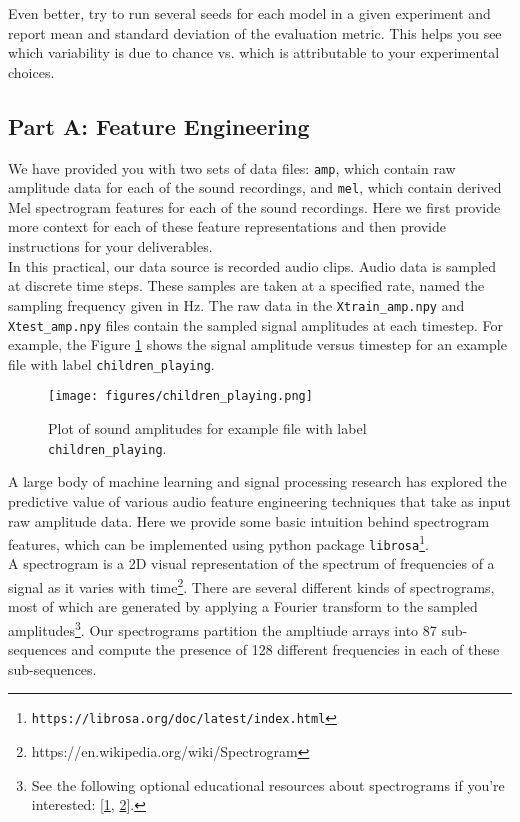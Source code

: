 \documentclass[12pt]{article}
\begin{document}
\noindent Even better, try to run several seeds for each model in a given experiment and report mean and standard deviation of the evaluation metric. This helps you see which variability is due to chance vs. which is attributable 
to your experimental choices.

\subsection{Part A: Feature Engineering}

We have provided you with two sets of data files: \texttt{amp}, which contain raw amplitude data for each of the sound recordings, and \texttt{mel}, which contain derived Mel spectrogram features for each of the sound recordings.  Here we first provide more context for each of these feature representations and then provide instructions for your deliverables.\\

\noindent In this practical, our data source is recorded audio clips.  Audio data is sampled at discrete time steps.  These samples are taken at a specified rate, named the sampling frequency given in Hz.  The raw data in the \texttt{Xtrain\_amp.npy} and \texttt{Xtest\_amp.npy} files contain the sampled signal amplitudes at each timestep.  For example, the Figure \ref{fig:amplitude_plot} shows the signal amplitude versus timestep for an example file with label \texttt{children\_playing}.
\begin{figure}
\centering
\texttt{[image: figures/children\_playing.png]}
\caption{Plot of sound amplitudes for example file with label \texttt{children\_playing}.}
\label{fig:amplitude_plot}
\end{figure}
A large body of machine learning and signal processing research has explored the predictive value of various audio feature engineering techniques that take as input raw amplitude data.  Here we provide some basic intuition behind spectrogram features, which can be implemented using python package \texttt{librosa\footnote{https://librosa.org/doc/latest/index.html}}.\\ 

\noindent A spectrogram is a 2D visual representation of the spectrum of frequencies of a signal as it varies with time\footnote{https://en.wikipedia.org/wiki/Spectrogram}.  There are several different kinds of spectrograms, most of which are generated by applying a Fourier transform to the sampled amplitudes\footnote{See the following optional educational resources about spectrograms if you're interested: [\href{https://www.izotope.com/en/learn/understanding-spectrograms.html}{1}, \href{https://www.princeton.edu/~cuff/ele201/files/spectrogram.pdf}{2}].}.
Our spectrograms partition the ampltiude arrays into 87 
sub-sequences and compute the presence of 128 different frequencies in each of these sub-sequences.\\
\end{document}
